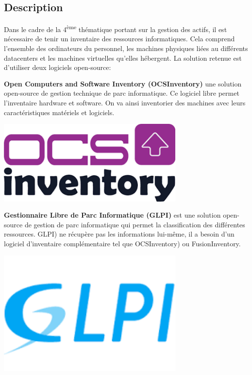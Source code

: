 \documentclass[12pt, a4paper, twoside]{article}
\begin{document}
\subsection{Description}

Dans le cadre de la 4\textsuperscript{ème} thématique portant sur la gestion des actifs, il est nécessaire de tenir un inventaire des ressources informatiques. 
Cela comprend l'ensemble des ordinateurs du personnel, les machines physiques liées au différents datacenters et les machines virtuelles qu'elles hébergent.
La solution retenue est d'utiliser deux logiciels open-source:

\noindent%
\begin{minipage}{.7\textwidth}%
\textbf{Open Computers and Software Inventory (\gls{OCSInventory})} une solution open-source de gestion technique de parc informatique. 
Ce logiciel libre permet l’inventaire hardware et software. 
On va ainsi inventorier des machines avec leurs caractéristiques matériels et logiciels.
\end{minipage}%
\hfill
\begin{minipage}{.3\textwidth}%
\begin{center}
\includegraphics[width=0.7\textwidth]{src/logo_ocsinventory.png}
\end{center}
\end{minipage}%

\noindent%
\begin{minipage}{.7\textwidth}%
\textbf{Gestionnaire Libre de Parc Informatique (\gls{GLPI})} est une solution open-source de gestion de parc informatique qui permet la classification des différentes ressources. 
\gls{GLPI}) ne récupère pas les informations lui-même, il a besoin d'un logiciel d'inventaire complémentaire tel que \gls{OCSInventory}) ou FusionInventory.
\end{minipage}%
\hfill
\begin{minipage}{.3\textwidth}%
\begin{center}
\includegraphics[width=0.7\textwidth]{src/logo_glpi.png} 
\end{center}
\end{minipage}%
\end{document}
